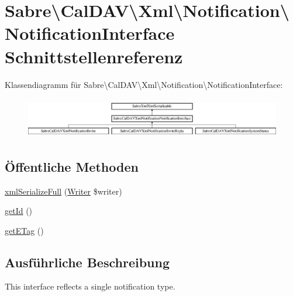 \hypertarget{interface_sabre_1_1_cal_d_a_v_1_1_xml_1_1_notification_1_1_notification_interface}{}\section{Sabre\textbackslash{}Cal\+D\+AV\textbackslash{}Xml\textbackslash{}Notification\textbackslash{}Notification\+Interface Schnittstellenreferenz}
\label{interface_sabre_1_1_cal_d_a_v_1_1_xml_1_1_notification_1_1_notification_interface}
Klassendiagramm für Sabre\textbackslash{}Cal\+D\+AV\textbackslash{}Xml\textbackslash{}Notification\textbackslash{}Notification\+Interface\+:\begin{figure}[H]
\begin{center}
\leavevmode
\includegraphics[height=1.789137cm]{interface_sabre_1_1_cal_d_a_v_1_1_xml_1_1_notification_1_1_notification_interface}
\end{center}
\end{figure}
\subsection*{Öffentliche Methoden}
\begin{DoxyCompactItemize}
\item 
\mbox{\hyperlink{interface_sabre_1_1_cal_d_a_v_1_1_xml_1_1_notification_1_1_notification_interface_abb545ebd302b3bdf972d159065c6a8b4}{xml\+Serialize\+Full}} (\mbox{\hyperlink{class_sabre_1_1_xml_1_1_writer}{Writer}} \$writer)
\item 
\mbox{\hyperlink{interface_sabre_1_1_cal_d_a_v_1_1_xml_1_1_notification_1_1_notification_interface_a5fada5863f3ce0575c92bf56d4c76fdc}{get\+Id}} ()
\item 
\mbox{\hyperlink{interface_sabre_1_1_cal_d_a_v_1_1_xml_1_1_notification_1_1_notification_interface_a5f87e03e47df0de258d637209fc906be}{get\+E\+Tag}} ()
\end{DoxyCompactItemize}


\subsection{Ausführliche Beschreibung}
This interface reflects a single notification type.

